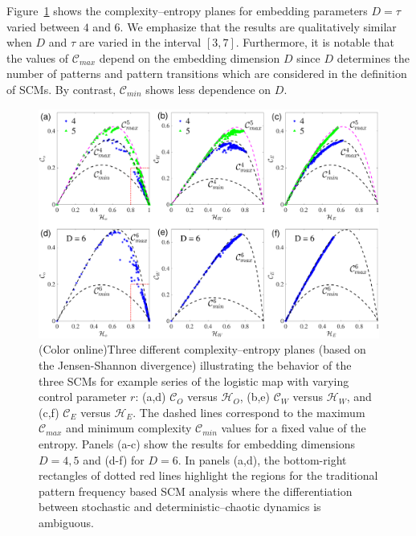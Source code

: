 \documentclass[12pt,aip,cha,reprint,nofootinbib]{revtex4-1}
\begin{document}
Figure~\ref{fig:CElogistic} shows the complexity--entropy planes for embedding parameters $D = \tau$ varied between $4$ and $6$. We emphasize that the results are qualitatively similar when $D$ and $\tau$ are varied in the interval $[3, 7]$. Furthermore, it is notable that the values of $\mathcal{C}_{max}$ depend on the embedding dimension $D$ since $D$ determines the number of patterns and pattern transitions which are considered in the definition of SCMs. By contrast, $\mathcal{C}_{min}$ shows less dependence on $D$. 

\begin{figure}
	\centering 
	\includegraphics[width=2\columnwidth]{CompEntropy_LogisticHC.pdf}
\caption{\small{(Color online)Three different complexity--entropy planes (based on the Jensen-Shannon divergence) illustrating the behavior of the three SCMs for example series of the logistic map with varying control parameter $r$: (a,d) $\mathcal{C}_O$ versus $\mathcal{H}_O$, (b,e) $\mathcal{C}_{W}$ versus $\mathcal{H}_{W}$, and (c,f) $\mathcal{C}_{E}$ versus $\mathcal{H}_{E}$. The dashed lines correspond to the maximum $\mathcal{C}_{max}$ and minimum complexity $\mathcal{C}_{min}$ values for a fixed value of the entropy. Panels (a-c) show the results for embedding dimensions $D = 4,5$ and (d-f) for $D = 6$. In panels (a,d), the bottom-right rectangles of dotted red lines highlight the regions for the traditional pattern frequency based SCM analysis where the differentiation between stochastic and deterministic--chaotic dynamics is ambiguous. }  \label{fig:CElogistic}}
\end{figure}
\end{document}
